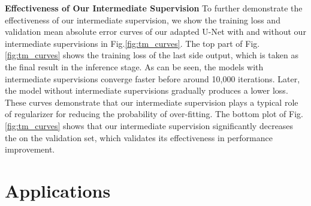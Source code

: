 \documentclass[10pt,twocolumn,letterpaper]{article}
\newcommand{\figref}[1]{Fig.\ref{#1}}
\begin{document}
\noindent 
\textbf{Effectiveness of Our Intermediate Supervision}
To further demonstrate the effectiveness of our intermediate supervision, we show the training loss and validation mean absolute error  curves of our adapted U-Net with and without our intermediate supervisions in \figref{fig:tm_curves}. The top part of \figref{fig:tm_curves} shows the training loss of the last side output, which is taken as the final result in the inference stage. As can be seen, the models with intermediate supervisions converge faster before around 10,000 iterations. Later, the model without intermediate supervisions gradually produces a lower loss. These curves demonstrate that our intermediate supervision plays a typical role of regularizer for reducing the probability of over-fitting. The bottom plot of \figref{fig:tm_curves} shows that our intermediate supervision significantly decreases the  on the validation set, which validates its effectiveness in performance improvement. 










\section{Applications}
\end{document}
